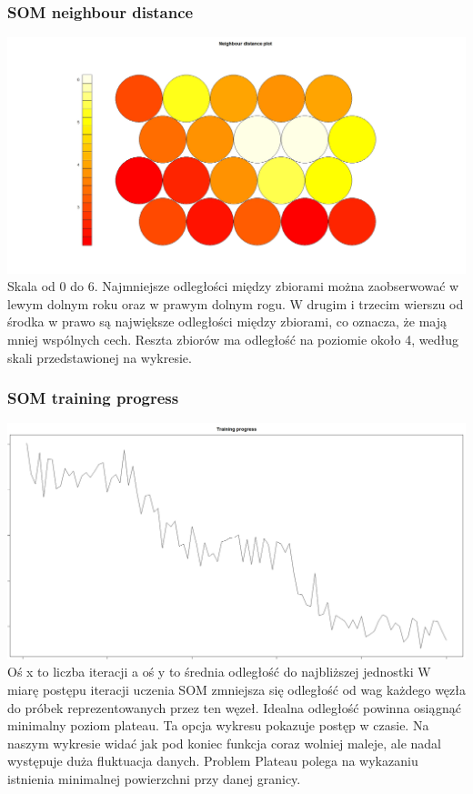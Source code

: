 \documentclass{article}
\begin{document}
        \subsubsection{SOM neighbour distance}
            \includegraphics[width = \textwidth]{som_neighbour_dist_fig.jpeg}
            Skala od 0 do 6. Najmniejsze odległości między zbiorami można zaobserwować w lewym dolnym roku oraz w prawym dolnym rogu. 
            W drugim i trzecim wierszu od środka w prawo są największe odległości między zbiorami, co oznacza, że mają mniej wspólnych cech. 
            Reszta zbiorów ma odległość na poziomie około 4, według skali przedstawionej na wykresie. 

        \subsubsection{SOM training progress}
            \includegraphics[width = \textwidth]{som_changes_fig.jpeg}
            Oś x to liczba iteracji a oś y to średnia odległość do najbliższej jednostki
            W miarę postępu iteracji uczenia SOM zmniejsza się odległość od wag każdego węzła do próbek reprezentowanych przez ten węzeł.
            Idealna odległość powinna osiągnąć minimalny poziom plateau. Ta opcja wykresu pokazuje postęp w czasie. Na naszym wykresie widać 
            jak pod koniec funkcja coraz wolniej maleje, ale nadal występuje duża fluktuacja danych. 
            Problem Plateau polega na wykazaniu istnienia minimalnej powierzchni przy danej granicy.
\end{document}
